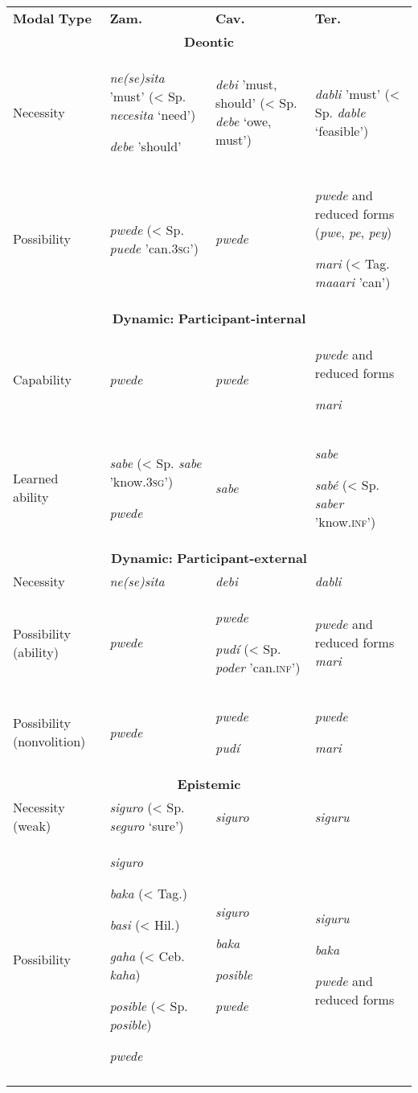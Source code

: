 \begin{tabularx}{\textwidth}{XXXX}

\lsptoprule

\textbf{Modal} \textbf{Type} & \textbf{Zam.} & \textbf{Cav.} & \textbf{Ter.}\\
\multicolumn{4}{c}{\textbf{Deontic} }\\
Necessity & \textit{ne(se)sita}  {}'must' (< Sp. \textit{necesita} ‘need’)

\textit{debe} 'should' & \textit{debi} {}'must, should' (< Sp. \textit{debe} ‘owe, must’) & \textit{dabli} 'must' (< Sp. \textit{dable} ‘feasible’)\\
Possibility & \textit{pwede} (< Sp. \textit{puede} 'can.3\textsc{sg}{}') & \textit{pwede} & \textit{pwede} and reduced forms (\textit{pwe}, \textit{pe}, \textit{pey})

\textit{mari} (< Tag. \textit{maaari} {}'can')\\
\multicolumn{4}{c}{\textbf{Dynamic:} \textbf{Participant-internal}}\\
Capability & \textit{pwede} & \textit{pwede} & \textit{pwede} and reduced forms

\textit{mari}\\
Learned ability & \textit{sabe} (< Sp. \textit{sabe} 'know.3\textsc{sg}{}')

\textit{pwede} & \textit{sabe} & \textit{sabe}

\textit{sabé} (< Sp. \textit{saber} 'know.\textsc{inf}{}')\\
\multicolumn{4}{c}{\textbf{Dynamic:} \textbf{Participant-external}}\\
Necessity & \textit{ne(se)sita} & \textit{debi} & \textit{dabli} \\
Possibility (ability) & \textit{pwede} & \textit{pwede}

\textit{pudí} (< Sp. \textit{poder} 'can.\textsc{inf}{}') & \textit{pwede} and reduced forms \textit{mari}  \\
Possibility (nonvolition) & \textit{pwede} & \textit{pwede}

\textit{pudí} & \textit{pwede} 

\textit{mari} \\
\multicolumn{4}{c}{\textbf{Epistemic}}\\
Necessity (weak) & \textit{siguro} (< Sp. \textit{seguro} ‘sure’) & \textit{siguro} & \textit{siguru}\\
Possibility & \textit{siguro}

\textit{baka} (< Tag.)

\textit{basi} (< Hil.)

\textit{gaha} (< Ceb. \textit{kaha})

\textit{posible} (< Sp. \textit{posible})

\textit{pwede} & \textit{siguro}

\textit{baka}

\textit{posible}

\textit{pwede} & \textit{siguru}

\textit{baka}

\textit{pwede} and reduced forms\\
\lspbottomrule
\end{tabularx}
